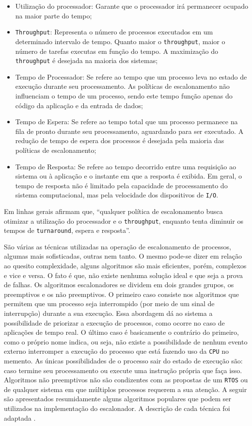 \begin{itemize}

	\item Utilização do processador: Garante que o processador irá permanecer ocupado na maior parte do tempo;
	\item \texttt{Throughput}: Representa o número de processos executados em um determinado intervalo de tempo. Quanto maior o \texttt{throughput}, maior o número de tarefas executas em função do tempo. A maximização do \texttt{throughput} é desejada na maioria dos sistemas;
	\item Tempo de Processador: Se refere ao tempo que um processo leva no estado de execução durante seu processamento. As políticas de escalonamento não influenciam o tempo de um processo, sendo este tempo função apenas do código da aplicação e da entrada de dados;
	\item Tempo de Espera: Se refere ao tempo total que um processo permanece na fila de pronto durante seu processamento, aguardando para ser executado. A redução de tempo de espera dos processos é desejada pela maioria das políticas de escalonamento; 
	\item Tempo de Resposta: Se refere ao tempo decorrido entre uma requisição ao sistema ou à aplicação e o instante em que a resposta é exibida. Em geral, o tempo de resposta não é limitado pela capacidade de processamento do sistema computacional, mas pela velocidade dos dispositivos de \texttt{I/O}. 

\end{itemize}

Em linhas gerais \cite{machadomaia} afirmam que, “qualquer política de escalonamento busca otimizar a utilização do processador e o \texttt{throughput}, enquanto tenta diminuir os tempos de \texttt{turnaround}, espera e resposta”. 

São várias as técnicas utilizadas na operação de escalonamento de processos, algumas mais sofisticadas, outras nem tanto. O mesmo pode-se dizer em relação ao quesito complexidade, alguns algoritmos são mais eficientes, porém, complexos e vice e versa. O fato é que, não existe nenhuma solução ideal e que seja a prova de falhas. Os algoritmos escalonadores se dividem em dois grandes grupos, os preemptivos e os não preemptivos. O primeiro caso consiste nos algoritmos que permitem que um processo seja interrompido (por meio de um sinal de interrupção) durante a sua execução. Essa abordagem dá ao sistema a possibilidade de priorizar a execução de processos, como ocorre no caso de aplicações de tempo real. O último caso é basicamente o contrário do primeiro, como o próprio nome indica, ou seja, não existe a possibilidade de nenhum evento externo interromper a execução do processo que está fazendo uso da \texttt{CPU} no memento. As únicas possibilidades de o processo sair do estado de execução são: caso termine seu processamento ou execute uma instrução própria que faça isso.  Algoritmos não preemptivos não são condizentes com as propostas de um \texttt{RTOS} ou de qualquer sistema em que múltiplos processos requerem a sua atenção. A seguir são apresentados resumidamente alguns algoritmos populares que podem ser utilizados na implementação do escalonador. A descrição de cada técnica foi adaptada \cite[p.~137-150]{machadomaia}.

